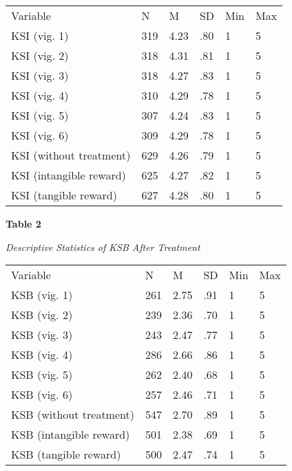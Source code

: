 \documentclass{article}
\begin{document}
\begin{table}

  
\begin{tabular}{l  l  l  l  l  l}

  Variable & N & M & SD & Min & Max\\
KSI (vig. 1) & 319 & 4.23 & .80 & 1 & 5\\
KSI (vig. 2) & 318 & 4.31 & .81 & 1 & 5\\
KSI (vig. 3) & 318 & 4.27 & .83 & 1 & 5\\
KSI (vig. 4) & 310 & 4.29 & .78 & 1 & 5\\
KSI (vig. 5) & 307 & 4.24 & .83 & 1 & 5\\
KSI (vig. 6) & 309 & 4.29 & .78 & 1 & 5\\
KSI (without treatment) & 629 & 4.26 & .79 & 1 & 5\\
KSI (intangible reward) & 625 & 4.27 & .82 & 1 & 5\\
KSI (tangible reward) & 627 & 4.28 & .80 & 1 & 5\\


\end{tabular}


\end{table}


\textbf{}

\textbf{Table 2}

\emph{Descriptive Statistics of KSB After Treatment}


\begin{table}

  
\begin{tabular}{l  l  l  l  l  l}

  Variable & N & M & SD & Min & Max\\
KSB (vig. 1) & 261 & 2.75 & .91 & 1 & 5\\
KSB (vig. 2) & 239 & 2.36 & .70 & 1 & 5\\
KSB (vig. 3) & 243 & 2.47 & .77 & 1 & 5\\
KSB (vig. 4) & 286 & 2.66 & .86 & 1 & 5\\
KSB (vig. 5) & 262 & 2.40 & .68 & 1 & 5\\
KSB (vig. 6) & 257 & 2.46 & .71 & 1 & 5\\
KSB (without treatment) & 547 & 2.70 & .89 & 1 & 5\\
KSB (intangible reward) & 501 & 2.38 & .69 & 1 & 5\\
KSB (tangible reward) & 500 & 2.47 & .74 & 1 & 5\\


\end{tabular}


\end{table}
\end{document}
